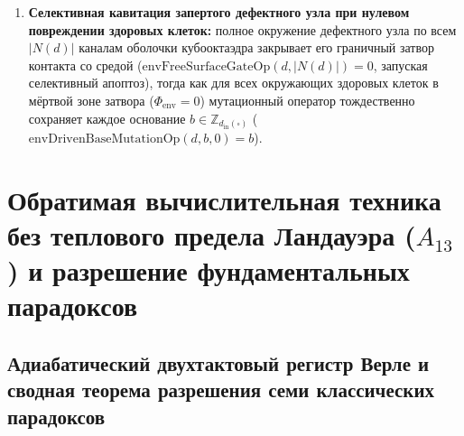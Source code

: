 \begin{theorem}
\begin{enumerate}[label=\textbf{(\roman*)},leftmargin=*]
\item \textbf{Селективная кавитация запертого дефектного узла при нулевом повреждении здоровых клеток:}
  полное окружение дефектного узла по всем $|N(d)|$ каналам оболочки кубооктаэдра закрывает его граничный затвор контакта со средой ($\mathrm{envFreeSurfaceGateOp}(d,|N(d)|) = 0$, запуская селективный апоптоз), тогда как для всех окружающих здоровых клеток в мёртвой зоне затвора ($\Phi_{\mathrm{env}}=0$) мутационный оператор тождественно сохраняет каждое основание $b\in\mathbb{Z}_{d_{\mathrm{in}}(\square)}$ ($\mathrm{envDrivenBaseMutationOp}(d,b,0) = b$).
\end{enumerate}
\end{theorem}

\chapter{Обратимая вычислительная техника без теплового предела Ландауэра (\texorpdfstring{$A_{13}$}{A13}) и разрешение фундаментальных парадоксов}
\label{ch:applied-reversible-computing-and-paradoxes}

\section{Адиабатический двухтактовый регистр Верле и сводная теорема разрешения семи классических парадоксов}
\label{sec:applied-landauer-and-paradoxes}

